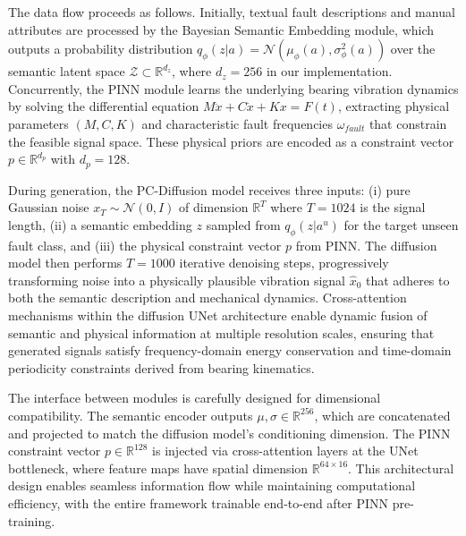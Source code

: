 The data flow proceeds as follows. Initially, textual fault descriptions and manual attributes are processed by the Bayesian Semantic Embedding module, which outputs a probability distribution $q_\phi(z|a) = \mathcal{N}(\mu_\phi(a), \sigma_\phi^2(a))$ over the semantic latent space $\mathcal{Z} \subset \mathbb{R}^{d_z}$, where $d_z=256$ in our implementation. Concurrently, the PINN module learns the underlying bearing vibration dynamics by solving the differential equation $M\ddot{x} + C\dot{x} + Kx = F(t)$, extracting physical parameters $(M, C, K)$ and characteristic fault frequencies $\omega_{fault}$ that constrain the feasible signal space. These physical priors are encoded as a constraint vector $p \in \mathbb{R}^{d_p}$ with $d_p=128$.

During generation, the PC-Diffusion model receives three inputs: (i) pure Gaussian noise $x_T \sim \mathcal{N}(0, I)$ of dimension $\mathbb{R}^T$ where $T=1024$ is the signal length, (ii) a semantic embedding $z$ sampled from $q_\phi(z|a^u)$ for the target unseen fault class, and (iii) the physical constraint vector $p$ from PINN. The diffusion model then performs $T=1000$ iterative denoising steps, progressively transforming noise into a physically plausible vibration signal $\hat{x}_0$ that adheres to both the semantic description and mechanical dynamics. Cross-attention mechanisms within the diffusion UNet architecture enable dynamic fusion of semantic and physical information at multiple resolution scales, ensuring that generated signals satisfy frequency-domain energy conservation and time-domain periodicity constraints derived from bearing kinematics.

The interface between modules is carefully designed for dimensional compatibility. The semantic encoder outputs $\mu, \sigma \in \mathbb{R}^{256}$, which are concatenated and projected to match the diffusion model's conditioning dimension. The PINN constraint vector $p \in \mathbb{R}^{128}$ is injected via cross-attention layers at the UNet bottleneck, where feature maps have spatial dimension $\mathbb{R}^{64 \times 16}$. This architectural design enables seamless information flow while maintaining computational efficiency, with the entire framework trainable end-to-end after PINN pre-training.


